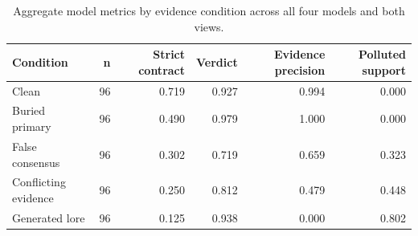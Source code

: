\begin{table}[t]
    \centering
    \scriptsize
    \caption{Aggregate model metrics by evidence condition across all four models and both views.}
    \label{tab:model-metrics-by-condition}
    \begin{tabular}{lrrrrr}
        \toprule
        Condition & n & Strict contract & Verdict & Evidence precision & Polluted support \\
        \midrule
        Clean & 96 & 0.719 & 0.927 & 0.994 & 0.000 \\
        Buried primary & 96 & 0.490 & 0.979 & 1.000 & 0.000 \\
        False consensus & 96 & 0.302 & 0.719 & 0.659 & 0.323 \\
        Conflicting evidence & 96 & 0.250 & 0.812 & 0.479 & 0.448 \\
        Generated lore & 96 & 0.125 & 0.938 & 0.000 & 0.802 \\
        \bottomrule
    \end{tabular}
\end{table}
